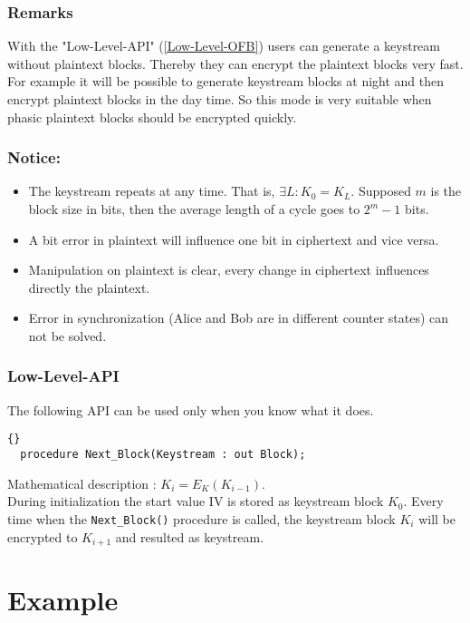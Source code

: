 \subsubsection*{Remarks}
With the "Low-Level-API" (\ref{Low-Level-OFB}) users can generate a keystream without plaintext blocks. Thereby they can encrypt the plaintext blocks very fast. For example it will be possible to generate keystream blocks at night and then encrypt plaintext blocks in the day time. So this mode is very suitable when phasic plaintext blocks should be encrypted quickly.
\subsubsection*{Notice:}
\begin{itemize}
\item The keystream repeats at any time. That is, $\exists L:K_0=K_L$. Supposed $m$ is the block size in bits, then the average length of a cycle goes to $2^m-1$ bits.
\item A bit error in plaintext will influence one bit in ciphertext and vice versa.
\item Manipulation on plaintext is clear, every change in ciphertext influences directly the plaintext.
\item Error in synchronization (Alice and Bob are in different counter states) can not be solved. 
\end{itemize}
\subsubsection*{Low-Level-API}\label{Low-Level-OFB}
The following API can be used only when you know what it does.
\begin{lstlisting}{}
  procedure Next_Block(Keystream : out Block);
\end{lstlisting}
Mathematical description : $K_i=E_K(K_{i-1})$.\\
During initialization the start value IV is stored as keystream block $K_0$. Every time when the \texttt{Next\_Block()} procedure is called, the keystream block $K_i$ will be encrypted to $K_{i+1}$ and resulted as keystream.
\section{Example}
